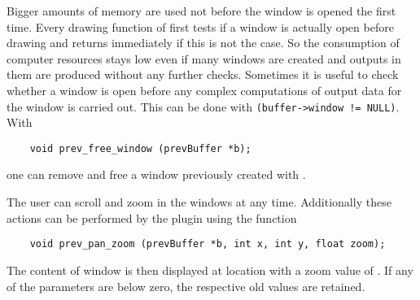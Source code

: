 Bigger amounts of memory are used not before the window is opened
the first time. Every drawing function of \icewing{} first tests if
a window is actually open before drawing and returns immediately if
this is not the case. So the consumption of computer resources stays
low even if many windows are created and outputs in them are
produced without any further checks. Sometimes it is useful to check
whether a window is open before any complex computations of output
data for the window is carried out. This can be done with
\verb|(buffer->window != NULL)|. With
\begin{small}
\linespread{0.9}
\begin{verbatim}
    void prev_free_window (prevBuffer *b);
\end{verbatim}
\end{small}
one can remove and free a window previously created with
.

The user can scroll and zoom in the windows at any
time. Additionally these actions can be performed by the plugin
using the function
\begin{small}
\linespread{0.9}
\begin{verbatim}
    void prev_pan_zoom (prevBuffer *b, int x, int y, float zoom);
\end{verbatim}
\end{small}
The content of window  is then displayed at location
 with a zoom value of . If any of the
parameters are below zero, the respective old values are retained.


